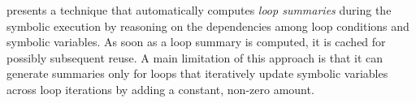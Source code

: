 
\cite{GL-ISSTA11} presents a technique that automatically computes {\em loop summaries} during the symbolic execution by reasoning on the dependencies among loop conditions and symbolic variables. As soon as a loop summary is computed, it is cached for possibly subsequent reuse. A main limitation of this approach is that it can generate summaries only for loops that iteratively update symbolic variables across loop iterations by adding a constant, non-zero amount.


